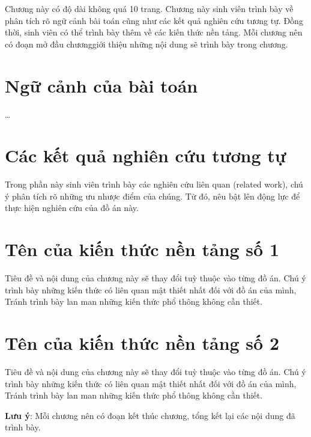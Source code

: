 \documentclass[../DoAn.tex]{subfiles}
\begin{document}
Chương này có độ dài không quá 10 trang. Chương này sinh viên trình bày về phân tích rõ ngữ cảnh bài toán cũng như các kết quả nghiên cứu tương tự. Đồng thời, sinh viên có thể trình bày thêm về các kiến thức nền tảng. Mỗi chương nên có đoạn mở đầu chươnggiới thiệu những nội dung sẽ trình bày trong chương.

\section{Ngữ cảnh của bài toán}
\ldots

\section{Các kết quả nghiên cứu tương tự}
Trong phần này sinh viên trình bày các nghiên cứu liên quan (related work), chú ý phân tích rõ những ưu nhược điểm của chúng. Từ đó, nêu bật lên động lực để thực hiện nghiên cứu của đồ án này.


\section{Tên của kiến thức nền tảng số 1}
Tiêu đề và nội dung của chương này sẽ thay đổi tuỳ thuộc vào từng đồ án. Chú ý trình bày những kiến thức có liên quan mật thiết nhất đối với đồ án của mình, Tránh trình bày lan man những kiến thức phổ thông không cần thiết. 

\section{Tên của kiến thức nền tảng số 2}
Tiêu đề và nội dung của chương này sẽ thay đổi tuỳ thuộc vào từng đồ án. Chú ý trình bày những kiến thức có liên quan mật thiết nhất đối với đồ án của mình, Tránh trình bày lan man những kiến thức phổ thông không cần thiết.


\textbf{Lưu ý}: Mỗi chương nên có đoạn kết thúc chương,  tổng kết lại các nội dung đã trình bày.
\end{document}
